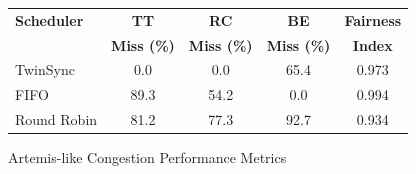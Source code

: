 
\begin{figure}[!t]
\centering
\footnotesize
\begin{tabular}{@{}lcccc@{}}
\toprule
\textbf{Scheduler} & \textbf{TT} & \textbf{RC} & \textbf{BE} & \textbf{Fairness} \\
& \textbf{Miss (\%)} & \textbf{Miss (\%)} & \textbf{Miss (\%)} & \textbf{Index} \\
\midrule
TwinSync & 0.0 & 0.0 & 65.4 & 0.973 \\
FIFO & 89.3 & 54.2 & 0.0 & 0.994 \\
Round Robin & 81.2 & 77.3 & 92.7 & 0.934 \\
\bottomrule
\end{tabular}
\caption{Artemis-like Congestion Performance Metrics}
\label{fig:artemis_results}
\vspace{-0.3cm}
\end{figure}
